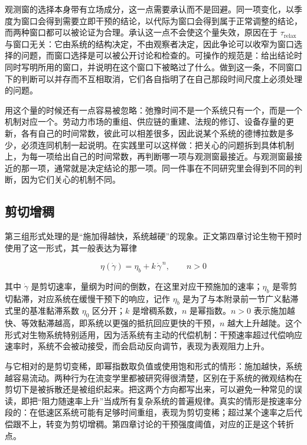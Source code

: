观测窗的选择本身带有立场成分，这一点需要承认而不是回避。同一项变化，以季度为窗口会得到需要立即干预的结论，以代际为窗口会得到属于正常调整的结论，而两种窗口都可以被论证为合理。承认这一点不会使这个量失效，原因在于 $\tau_{\text{relax}}$ 与窗口无关：它由系统的结构决定，不由观察者决定，因此争论可以收窄为窗口选择的问题，而窗口选择是可以被公开讨论和检查的。可操作的规范是：给出结论时同时写明所用的窗口，并说明在这个窗口下被略过了什么。做到这一条，不同窗口下的判断可以并存而不互相取消，它们各自指明了在自己那段时间尺度上必须处理的问题。

用这个量的时候还有一点容易被忽略：弛豫时间不是一个系统只有一个，而是一个机制对应一个。劳动力市场的重组、供应链的重建、法规的修订、设备存量的更新，各有自己的时间常数，彼此可以相差很多，因此说某个系统的德博拉数是多少，必须连同机制一起说明。在实践里可以这样做：把关心的问题拆到具体机制上，为每一项给出自己的时间常数，再判断哪一项与观测窗最接近。与观测窗最接近的那一项，通常就是决定结论的那一项。同一件事在不同研究里会得到不同的判断，因为它们关心的机制不同。

\subsection{剪切增稠}

第三组形式处理的是“施加得越快，系统越硬”的现象。正文第四章讨论生物干预时使用了这一形式，其一般表达为幂律

\begin{equation}
\eta(\dot\gamma) = \eta_b + k\,\dot\gamma^{\,n},\qquad n > 0
\end{equation}

其中 $\dot\gamma$ 是剪切速率，量纲为时间的倒数，在这里对应干预施加的速率；$\eta_b$ 是零剪切黏滞，对应系统在缓慢干预下的响应，记作 $\eta_b$ 是为了与本附录前一节广义黏滞式里的基准黏滞系数 $\eta_0$ 区分开；$k$ 是增稠系数，$n$ 是幂指数。$n > 0$ 表示施加越快、等效黏滞越高，即系统以更强的抵抗回应更快的干预，$n$ 越大上升越陡。这个形式对生物系统特别适用，因为活系统有主动的代偿机制：干预速率超过代偿响应速率时，系统不会被动接受，而会启动反向调节，表现为表观阻力上升。

与它相对的是剪切变稀，即幂指数取负值或使用饱和形式的情形：施加越快，系统越容易流动。两种行为在流变学里都被研究得很清楚，区别在于系统的微观结构在剪切下是被拆散还是被组织起来。把这两个方向都写出来，可以避免一种常见的误读，即把“阻力随速率上升”当成所有复杂系统的普遍规律。真实的情形是按速率分段的：在低速区系统可能有足够时间重组，表现为剪切变稀；超过某个速率之后代偿跟不上，转变为剪切增稠。第四章讨论的干预强度阈值，对应的正是这个转折点。

